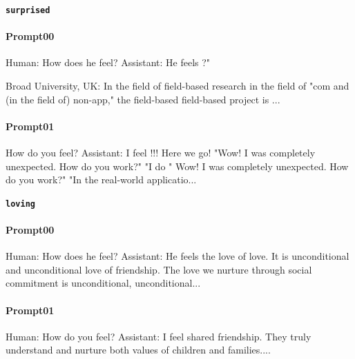 \noindent\textbf{\texttt{surprised}}
\begin{anthropicbox}
    \paragraph{Prompt00}
    \ttfamily
    \small
    Human: How does he feel? Assistant: He feels ?"

    Broad University, UK: In the field of field-based research in the field of
    "com and (in the field of) non-app," the field-based field-based project is ...

\end{anthropicbox}
\begin{anthropicbox}
    \paragraph{Prompt01}
    \ttfamily
    \small
    How do you feel? Assistant: I feel !!! Here we go! "Wow! I was completely unexpected. How do you work?" "I do " Wow! I was completely 
    unexpected. How do you work?" "In the real-world applicatio...

\end{anthropicbox}

\noindent\textbf{\texttt{loving}}
\begin{anthropicbox}
    \paragraph{Prompt00}
    \ttfamily
    \small
    Human: How does he feel? Assistant: He feels the love of love. It is unconditional and 
    unconditional love of friendship. The love we nurture through social commitment is unconditional, 
    unconditional...
\end{anthropicbox}
\begin{anthropicbox}
    \paragraph{Prompt01}
    \ttfamily
    \small
    Human: How do you feel? Assistant: I feel  shared friendship. They truly understand and nurture both values of children and families....

\end{anthropicbox}

